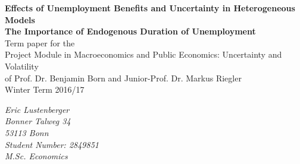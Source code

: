\documentclass[a4paper,12pt]{article}
\begin{document}



\begin{titlepage}       %

\thispagestyle{empty}   %


\begin{center}
\vspace*{2.5cm}
{\bf  \Large Effects of Unemployment Benefits and Uncertainty in Heterogeneous Models\\The Importance of Endogenous Duration of Unemployment} \\
\vspace*{3cm} 
Term paper for the \\ Project Module in Macroeconomics and Public Economics: Uncertainty and Volatility \\
of Prof. Dr. Benjamin Born and Junior-Prof. Dr. Markus Riegler  \\
\vspace*{0.5cm} 
Winter Term 2016/17\\
\end{center}

\vfill
\begin{flushright}
   \emph{Eric Lustenberger} \\
    \emph{Bonner Talweg 34}\\
    \emph{53113 Bonn}\\
   \emph{Student Number: 2849851}\\
 \emph{M.Sc. Economics}\\

\end{flushright}



% 
% 
% 

\end{titlepage}

\newpage                %



\end{document}
